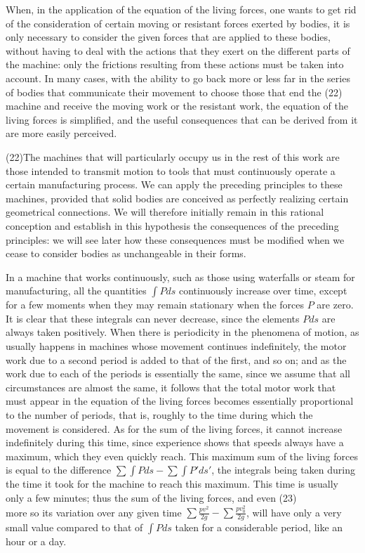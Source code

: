 \documentclass{book}
\begin{document}
When, in the application of the equation of the living forces, one wants to get rid of the consideration of certain moving or resistant forces exerted by bodies, it is only necessary to consider the given forces that are applied to these bodies, without having to deal with the actions that they exert on the different parts of the machine: only the frictions resulting from these actions must be taken into account. In many cases, with the ability to go back more or less far in the series of bodies that communicate their movement to choose those that end the 
\newpage
(22)\\
machine and receive the moving work or the resistant work, the equation of the living forces is simplified, and the useful consequences that can be derived from it are more easily perceived.

(22)The machines that will particularly occupy us in the rest of this work are those intended to transmit motion to tools that must continuously operate a certain manufacturing process. We can apply the preceding principles to these machines, provided that solid bodies are conceived as perfectly realizing certain geometrical connections. We will therefore initially remain in this rational conception and establish in this hypothesis the consequences of the preceding principles: we will see later how these consequences must be modified when we cease to consider bodies as unchangeable in their forms.

In a machine that works continuously, such as those using waterfalls or steam for manufacturing, all the quantities \(\int Pds\) continuously increase over time, except for a few moments when they may remain stationary when the forces \(P\) are zero. It is clear that these integrals can never decrease, since the elements \(Pds\) are always taken positively. When there is periodicity in the phenomena of motion, as usually happens in machines whose movement continues indefinitely, the motor work due to a second period is added to that of the first, and so on; and as the work due to each of the periods is essentially the same, since we assume that all circumstances are almost the same, it follows that the total motor work that must appear in the equation of the living forces becomes essentially proportional to the number of periods, that is, roughly to the time during which the movement is considered. As for the sum of the living forces, it cannot increase indefinitely during this time, since experience shows that speeds always have a maximum, which they even quickly reach. This maximum sum of the living forces is equal to the difference \(\sum \int Pds - \sum \int P'ds'\), the integrals being taken during the time it took for the machine to reach this maximum. This time is usually only a few minutes; thus the sum of the living forces, and even 
\newpage(23)\\
more so its variation over any given time \(\sum \frac{pv^2}{2g} - \sum \frac{pv_0^2}{2g}\), will have only a very small value compared to that of \(\int Pds\) taken for a considerable period, like an hour or a day.
\end{document}
